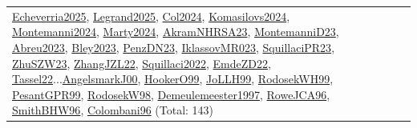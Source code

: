 {\begin{longtable}{p{3cm}r>{\raggedright\arraybackslash}p{6cm}>{\raggedright\arraybackslash}p{6cm}>{\raggedright\arraybackslash}p{8cm}}
\hyperref[detail:Echeverria2025]{Echeverria2025}, \hyperref[detail:Legrand2025]{Legrand2025}, \hyperref[detail:Col2024]{Col2024}, \hyperref[detail:Komasilovs2024]{Komasilovs2024}, \hyperref[detail:Montemanni2024]{Montemanni2024}, \hyperref[detail:Marty2024]{Marty2024}, \hyperref[detail:AkramNHRSA23]{AkramNHRSA23}, \hyperref[detail:MontemanniD23]{MontemanniD23}, \hyperref[detail:Abreu2023]{Abreu2023}, \hyperref[detail:Bley2023]{Bley2023}, \hyperref[detail:PenzDN23]{PenzDN23}, \hyperref[detail:IklassovMR023]{IklassovMR023}, \hyperref[detail:SquillaciPR23]{SquillaciPR23}, \hyperref[detail:ZhuSZW23]{ZhuSZW23}, \hyperref[detail:ZhangJZL22]{ZhangJZL22}, \hyperref[detail:Squillaci2022]{Squillaci2022}, \hyperref[detail:EmdeZD22]{EmdeZD22}, \hyperref[detail:Tassel22]{Tassel22}...\hyperref[detail:AngelsmarkJ00]{AngelsmarkJ00}, \hyperref[detail:HookerO99]{HookerO99}, \hyperref[detail:JoLLH99]{JoLLH99}, \hyperref[detail:RodosekWH99]{RodosekWH99}, \hyperref[detail:PesantGPR99]{PesantGPR99}, \hyperref[detail:RodosekW98]{RodosekW98}, \hyperref[detail:Demeulemeester1997]{Demeulemeester1997}, \hyperref[detail:RoweJCA96]{RoweJCA96}, \hyperref[detail:SmithBHW96]{SmithBHW96}, \hyperref[detail:Colombani96]{Colombani96} (Total: 143)\\

\end{longtable}}

